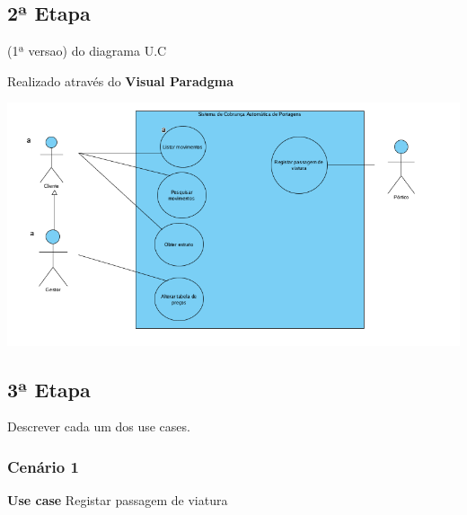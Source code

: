 \documentclass[11pt]{article}
\begin{document}
\subsection{2ª Etapa}
\label{sec:orgd7bcd3c}
(1ª versao) do diagrama U.C

Realizado através do \textbf{Visual Paradgma}
\begin{center}
\includegraphics[width=.9\linewidth]{./portagens.png}
\end{center}

\subsection{3ª Etapa}
\label{sec:org2395d5f}
Descrever cada um dos use cases.

\subsubsection{Cenário 1}
\label{sec:org3b0e1fb}
\textbf{Use case} Registar passagem de viatura
\end{document}
